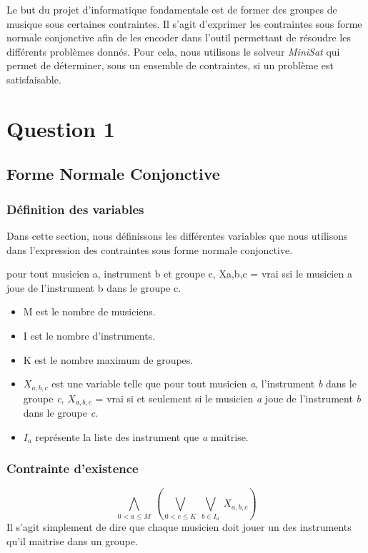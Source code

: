 \documentclass[11pt]{article}
\begin{document}
Le but du projet d'informatique fondamentale est de former des groupes de musique sous certaines contraintes. Il s'agit d'exprimer les contraintes sous forme normale conjonctive afin de les encoder dans l'outil permettant de résoudre les différents problèmes donnés. Pour cela, nous utilisons le solveur \textit{MiniSat} qui permet de déterminer, sous un ensemble de contraintes, si un problème est satisfaisable.

\section{Question 1}

\subsection{Forme Normale Conjonctive}

\subsubsection{Définition des variables}

Dans cette section, nous définissons les différentes variables que nous utilisons dans l'expression des contraintes sous forme normale conjonctive.

pour tout musicien a, instrument b et groupe c, Xa,b,c = vrai ssi le musicien a joue de l’instrument b dans le groupe c.

\begin{itemize}
\item M est le nombre de musiciens.
\item I est le nombre d'instruments.
\item K est le nombre maximum de groupes.
\item $X_{a,b,c}$ est une variable telle que pour tout musicien \textit{a}, l'instrument \textit{b} dans le groupe \textit{c}, $X_{a,b,c}$ = vrai si et seulement si le musicien \textit{a} joue de l’instrument \textit{b} dans le groupe \textit{c}.
\item $I_a$ représente la liste des instrument que \textit{a} maitrise.
\end{itemize}

\subsubsection{Contrainte d'existence}

$$\bigwedge\limits_{0<a\le M}\ \left(\bigvee\limits_{0<c\le K}\ \bigvee\limits_{b\in I_a}\ X_{a,b,c}\right)$$
Il s'agit simplement de dire que chaque musicien doit jouer un des instruments qu'il maitrise dans un groupe.
\end{document}
